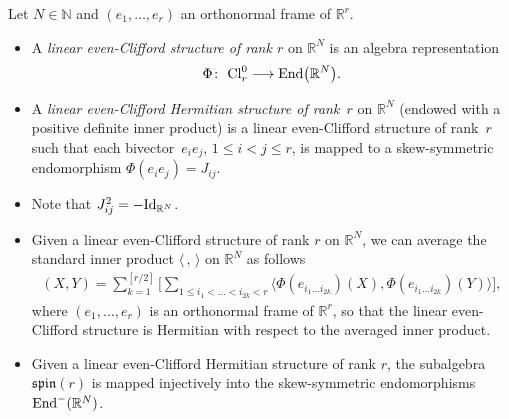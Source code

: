 \documentclass[10pt,a4paper]{amsart}
\newcommand{\End}{{\rm End}}
\numberwithin{equation}{section}
\begin{document}
\begin{Definition} Let $N\in \mathbb{N}$ and $(e_1,\dots,e_r)$ an orthonormal frame of $\mathbb{R}^r$.
\begin{itemize}\itemsep=0pt
\item A {\em linear even-Clifford structure of rank $r$} on $\mathbb{R}^N$ is an algebra representation
\begin{gather*}\Phi\colon \ {\rm Cl}_r^0\longrightarrow \End\big(\mathbb{R}^N\big).\end{gather*}
\item A {\em linear even-Clifford Hermitian structure of rank~$r$} on $\mathbb{R}^N$ (endowed with a positive def\/inite inner product) is a linear even-Clif\/ford structure of rank~$r$ such that each bivec\-tor~$e_ie_j$, $1\leq i< j \leq r$, is mapped to a skew-symmetric endomorphism $\Phi(e_ie_j)=J_{ij}$.
\end{itemize}
\end{Definition}

\begin{Remark}\quad
\begin{itemize}\itemsep=0pt
\item Note that $J_{ij}^2=-{\rm Id}_{\mathbb{R}^N}$.
\item Given a linear even-Clif\/ford structure of rank $r$ on $\mathbb{R}^N$, we can average the standard inner product $\langle \,,\,\rangle $ on $\mathbb{R}^N$ as follows
\begin{gather*}(X,Y)=\sum_{k=1}^{[r/2]} \bigg[\sum_{1\leq i_1<\dots<i_{2k}<r}
\langle \Phi(e_{i_1\dots i_{2k}})(X),\Phi(e_{i_1\dots i_{2k}})(Y)\rangle \bigg], \end{gather*}
where $(e_1,\dots,e_r)$ is an orthonormal frame of $\mathbb{R}^r$, so that the linear even-Clif\/ford structure is Hermitian with respect to the averaged inner product.
\item Given a linear even-Clif\/ford Hermitian structure of rank $r$, the subalgebra~$\mathfrak{spin}(r)$ is mapped injectively into the skew-symmetric endomorphisms $\End^-(\mathbb{R}^N)$.
\end{itemize}
\end{Remark}
\end{document}
